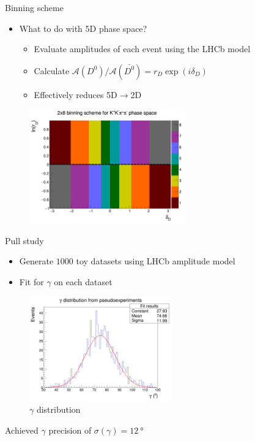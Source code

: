 \documentclass{beamer}
\begin{document}
\begin{frame}{Binning scheme}
  \begin{itemize}
    \item{What to do with 5D phase space?}
    \begin{itemize}
      \item{Evaluate amplitudes of each event using the LHCb model}
      \item{Calculate $\mathcal{A}(D^0)/\mathcal{A}(\bar{D^0}) = r_D\exp(i\delta_D)$}
      \item{Effectively reduces 5D$\to$2D}
    \end{itemize}
  \end{itemize}
  \begin{figure}
    \centering
    \includegraphics[width = 0.6\textwidth]{../Report/Plots/BinningSchemePlot.png}
  \end{figure}
\end{frame}

\begin{frame}{Pull study}
  \begin{itemize}
    \item{Generate $1000$ toy datasets using LHCb amplitude model}
    \item{Fit for $\gamma$ on each dataset}
  \end{itemize}
  \begin{figure}
    \centering
    \includegraphics[width = 0.55\textwidth]{../Report/Plots/GammaDistribution8BinsVariableWidth.png}
    \caption{$\gamma$ distribution}
  \end{figure}
  \vspace{-0.5cm}
  \begin{center}
    Achieved $\gamma$ precision of $\sigma(\gamma) = \SI{12}{\degree}$
  \end{center}
\end{frame}
\end{document}
